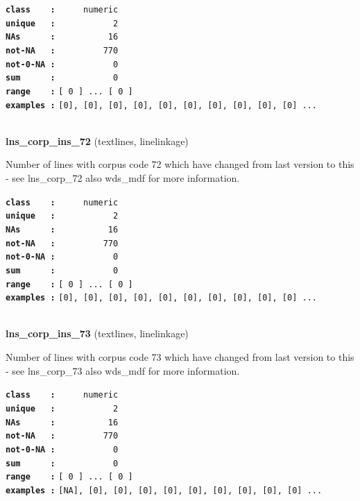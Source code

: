 \documentclass[]{article}
\begin{document}
\textbf{\texttt{class\ \ \ \ :}} \texttt{~~~~~numeric}\\
\textbf{\texttt{unique\ \ \ :}} \texttt{~~~~~~~~~~~2}\\
\textbf{\texttt{NAs\ \ \ \ \ \ :}} \texttt{~~~~~~~~~~16}\\
\textbf{\texttt{not-NA\ \ \ :}} \texttt{~~~~~~~~~770}\\
\textbf{\texttt{not-0-NA\ :}} \texttt{~~~~~~~~~~~0}\\
\textbf{\texttt{sum\ \ \ \ \ \ :}} \texttt{~~~~~~~~~~~0}\\
\textbf{\texttt{range\ \ \ \ :}}
\texttt{{[}\ 0\ {]}\ ...\ {[}\ 0\ {]}}\\
\textbf{\texttt{examples\ :}}
\texttt{{[}0{]},\ {[}0{]},\ {[}0{]},\ {[}0{]},\ {[}0{]},\ {[}0{]},\ {[}0{]},\ {[}0{]},\ {[}0{]},\ {[}0{]}\ ...}\\

~

\textbf{lns\_corp\_ins\_72} (textlines, linelinkage)

Number of lines with corpus code 72 which have changed from last version
to this - see lns\_corp\_72 also wds\_mdf for more information.

\textbf{\texttt{class\ \ \ \ :}} \texttt{~~~~~numeric}\\
\textbf{\texttt{unique\ \ \ :}} \texttt{~~~~~~~~~~~2}\\
\textbf{\texttt{NAs\ \ \ \ \ \ :}} \texttt{~~~~~~~~~~16}\\
\textbf{\texttt{not-NA\ \ \ :}} \texttt{~~~~~~~~~770}\\
\textbf{\texttt{not-0-NA\ :}} \texttt{~~~~~~~~~~~0}\\
\textbf{\texttt{sum\ \ \ \ \ \ :}} \texttt{~~~~~~~~~~~0}\\
\textbf{\texttt{range\ \ \ \ :}}
\texttt{{[}\ 0\ {]}\ ...\ {[}\ 0\ {]}}\\
\textbf{\texttt{examples\ :}}
\texttt{{[}0{]},\ {[}0{]},\ {[}0{]},\ {[}0{]},\ {[}0{]},\ {[}0{]},\ {[}0{]},\ {[}0{]},\ {[}0{]},\ {[}0{]}\ ...}\\

~

\textbf{lns\_corp\_ins\_73} (textlines, linelinkage)

Number of lines with corpus code 73 which have changed from last version
to this - see lns\_corp\_73 also wds\_mdf for more information.

\textbf{\texttt{class\ \ \ \ :}} \texttt{~~~~~numeric}\\
\textbf{\texttt{unique\ \ \ :}} \texttt{~~~~~~~~~~~2}\\
\textbf{\texttt{NAs\ \ \ \ \ \ :}} \texttt{~~~~~~~~~~16}\\
\textbf{\texttt{not-NA\ \ \ :}} \texttt{~~~~~~~~~770}\\
\textbf{\texttt{not-0-NA\ :}} \texttt{~~~~~~~~~~~0}\\
\textbf{\texttt{sum\ \ \ \ \ \ :}} \texttt{~~~~~~~~~~~0}\\
\textbf{\texttt{range\ \ \ \ :}}
\texttt{{[}\ 0\ {]}\ ...\ {[}\ 0\ {]}}\\
\textbf{\texttt{examples\ :}}
\texttt{{[}NA{]},\ {[}0{]},\ {[}0{]},\ {[}0{]},\ {[}0{]},\ {[}0{]},\ {[}0{]},\ {[}0{]},\ {[}0{]},\ {[}0{]}\ ...}\\
\end{document}
